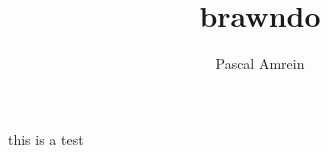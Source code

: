 \documentclass[10pt,a4paper]{report}
\author{Pascal Amrein}
\title{brawndo}
\begin{document}
this is a test
\end{document}
